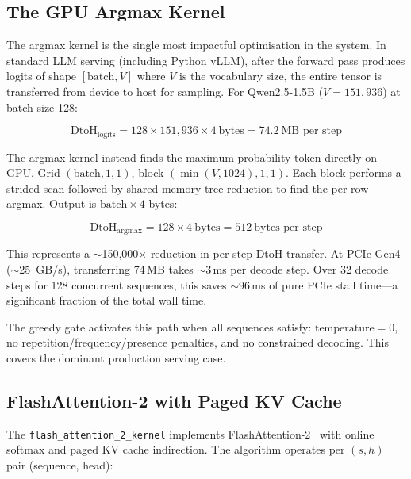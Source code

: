 \documentclass[11pt,a4paper]{article}
\begin{document}
\subsection{The GPU Argmax Kernel}
\label{sec:argmax}

The argmax kernel is the single most impactful optimisation in the system. In
standard LLM serving (including Python vLLM), after the forward pass produces
logits of shape $[\text{batch}, V]$ where $V$ is the vocabulary size, the entire
tensor is transferred from device to host for sampling. For Qwen2.5-1.5B
($V\!=\!151{,}936$) at batch size 128:

\begin{equation}
  \text{DtoH}_{\text{logits}} = 128 \times 151{,}936 \times 4~\text{bytes} = 74.2~\text{MB per step}
\end{equation}

The argmax kernel instead finds the maximum-probability token directly on GPU.
Grid $(\text{batch}, 1, 1)$, block $(\min(V, 1024), 1, 1)$. Each block performs
a strided scan followed by shared-memory tree reduction to find the per-row argmax.
Output is $\text{batch} \times 4$ bytes:

\begin{equation}
  \text{DtoH}_{\text{argmax}} = 128 \times 4~\text{bytes} = 512~\text{bytes per step}
\end{equation}

This represents a $\sim$150{,}000$\times$ reduction in per-step DtoH transfer.
At PCIe Gen4 ($\sim$25~GB/s), transferring 74\,MB takes $\sim$3\,ms per decode
step. Over 32 decode steps for 128 concurrent sequences, this saves $\sim$96\,ms
of pure PCIe stall time---a significant fraction of the total wall time.

The greedy gate activates this path when all sequences satisfy: $\text{temperature}
= 0$, no repetition/frequency/presence penalties, and no constrained decoding.
This covers the dominant production serving case.

\subsection{FlashAttention-2 with Paged KV Cache}

The \texttt{flash\_attention\_2\_kernel} implements FlashAttention-2~\cite{dao2023flashattention2}
with online softmax and paged KV cache indirection. The algorithm operates per
$(s, h)$ pair (sequence, head):
\end{document}
